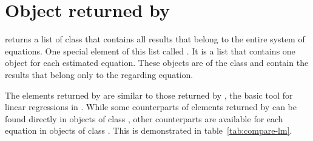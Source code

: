 \section[Object returned by systemfit]{Object returned by }
\label{sec:returned-object}

 returns a list of class 
that contains all results that belong to the entire system
of equations.
One special element of this list called .
It is a list that contains one object for each estimated equation.
These objects are of the class 
and contain the results that belong only to the regarding equation.

The elements returned by 
are similar to those returned by ,
the basic tool for linear regressions in .
While some counterparts of elements returned by 
can be found directly in objects of class ,
other counterparts are available for each equation
in objects of class .
This is demonstrated in table~\ref{tab:compare-lm}.


